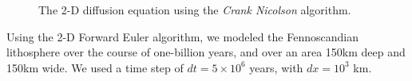 \documentclass[a4paper,10pt,english]{article}
\begin{document}
\begin{figure}[H]
 \centering
   	    \qquad
    \caption{The 2-D diffusion equation using the \textit{Crank Nicolson} algorithm.\label{fig_3}}
\end{figure}

Using the 2-D Forward Euler algorithm, we modeled the Fennoscandian lithosphere over the course of one-billion years, and over an area 150km deep and 150km wide.  We used a time step of $dt = 5 \times 10^6$ years, with $dx = 10^3$ km.
\end{document}
